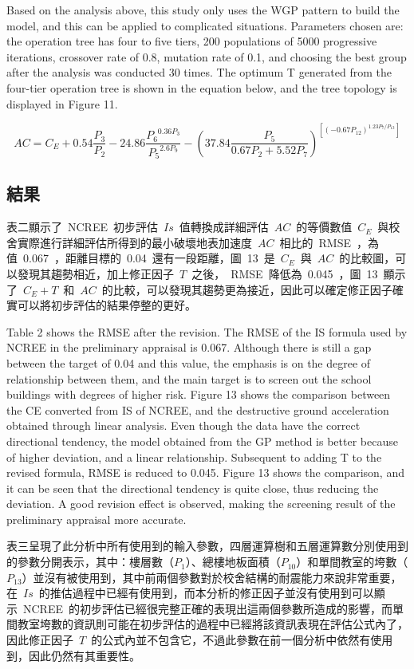 Based on the analysis above, this study only uses the WGP pattern to build the model, and this can be applied to complicated situations. Parameters chosen are: the operation tree has four to five tiers, 200 populations of 5000 progressive iterations, crossover rate of 0.8, mutation rate of 0.1, and choosing the best group after the analysis was conducted 30 times. The optimum T generated from the four-tier operation tree is shown in the equation below, and the tree topology is displayed in Figure 11.

\begin{equation} AC = C_E + 0.54 \dfrac{P_3}{P_2} - 24.86 \dfrac{ {P_6}^{0.36P_3} }{ {P_5}^{2.6P_9} } - ( 37.84 \dfrac{P_5}{0.67P_2 + 5.52P_7} )^{\left[ (-0.67 P_{12})^{1.23P_7/P_{13}} \right]} \label{eq:WGP_AC_IS}\end{equation}


\subsection{結果}

表二顯示了~NCREE~初步評估~$Is$~值轉換成詳細評估~$AC$~的等價數值~$C_E$~與校舍實際進行詳細評估所得到的最小破壞地表加速度~$AC$~相比的~RMSE~，為值~0.067~，距離目標的~0.04~還有一段距離，圖~13~是~$C_E$~與~$AC$~的比較圖，可以發現其趨勢相近，加上修正因子~$T$~之後，~RMSE~降低為~0.045~，圖~13~顯示了~$C_E + T$~和~$AC$~的比較，可以發現其趨勢更為接近，因此可以確定修正因子確實可以將初步評估的結果停整的更好。

Table 2 shows the RMSE after the revision. The RMSE of the IS formula used by NCREE in the preliminary appraisal is 0.067. Although there is still a gap between the target of 0.04 and this value, the emphasis is on the degree of relationship between them, and the main target is to screen out the school buildings with degrees of higher risk. Figure 13 shows the comparison between the CE converted from IS of NCREE, and the destructive ground acceleration obtained through linear analysis. Even though the data have the correct directional tendency, the model obtained from the GP method is better because of higher deviation, and a linear relationship. Subsequent to adding T to the revised formula, RMSE is reduced to 0.045. Figure 13 shows the comparison, and it can be seen that the directional tendency is quite close, thus reducing the deviation. A good revision effect is observed, making the screening result of the preliminary appraisal more accurate.

表三呈現了此分析中所有使用到的輸入參數，四層運算樹和五層運算數分別使用到的參數分開表示，其中：樓層數（$P_1$）、總樓地板面積（$P_{10}$）和單間教室的垮數（$P_{13}$）並沒有被使用到，其中前兩個參數對於校舍結構的耐震能力來說非常重要，在~$Is$~的推估過程中已經有使用到，而本分析的修正因子並沒有使用到可以顯示~NCREE~的初步評估已經很完整正確的表現出這兩個參數所造成的影響，而單間教室垮數的資訊則可能在初步評估的過程中已經將該資訊表現在評估公式內了，因此修正因子~$T$~的公式內並不包含它，不過此參數在前一個分析中依然有使用到，因此仍然有其重要性。

